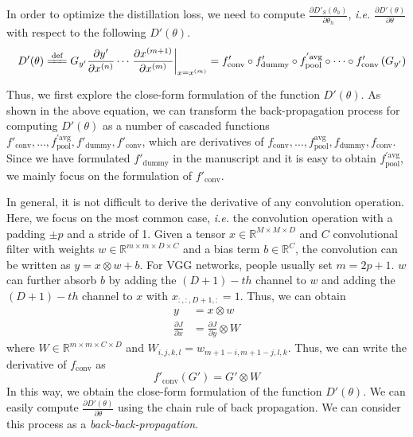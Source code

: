 \documentclass[10pt,twocolumn,letterpaper]{article}
\begin{document}
In order to optimize the distillation loss, we need to compute $\frac{\partial D'_{S}(\theta_{h})}{\partial\theta_{h}}$, \emph{i.e.} $\frac{\partial D'(\theta)}{\partial\theta}$ with respect to the following $D'(\theta)$.
\begin{equation}
\quad D'(\theta)\xlongequal[]{\textrm{def}}G_{y'}\frac{\partial y'}{\partial x^{(n)}}\cdots\left.\frac{\partial x^{(m+1)}}{\partial x^{(m)}}\right|_{x=x^{(m)}}
=f'_{\textrm{conv}}\circ f'_{\textrm{dummy}}\circ f_{\textrm{pool}}^{'\textrm{avg}}\circ\cdots\circ f'_{\textrm{conv}}\left(G_{y'}\right)\nonumber
\end{equation}

Thus, we first explore the close-form formulation of the function $D'(\theta)$. As shown in the above equation, we can transform the back-propagation process for computing $D'(\theta)$ as a number of cascaded functions $f'_{\textrm{conv}},\ldots,f_{\textrm{pool}}^{'\textrm{avg}},f'_{\textrm{dummy}},f'_{\textrm{conv}}$, which are derivatives of $f_{\textrm{conv}},\ldots,f_{\textrm{pool}}^{\textrm{avg}},f_{\textrm{dummy}},f_{\textrm{conv}}$. Since we have formulated $f'_{\textrm{dummy}}$ in the manuscript and it is easy to obtain $f_{\textrm{pool}}^{'\textrm{avg}}$, we mainly focus on the formulation of $f'_{\textrm{conv}}$.

In general, it is not difficult to derive the derivative of any convolution operation. Here, we focus on the most common case, \emph{i.e.} the convolution operation with a padding $\pm p$ and a stride of 1. Given a tensor $x\in{\mathbb R}^{M\times M\times D}$ and $C$ convolutional filter with weights $w\in{\mathbb R}^{m\times m\times D\times C}$ and a bias term $b\in{\mathbb R}^{C}$, the convolution can be written as $y=x\otimes w+b$. For VGG networks, people usually set $m=2p+1$. $w$ can further absorb $b$ by adding the $(D+1)-th$ channel to $w$ and adding the $(D+1)-th$ channel to $x$ with $x_{:,:,D+1,:}=1$. Thus, we can obtain
\begin{equation}
\begin{split}
y&=x\otimes w\\
\frac{\partial J}{\partial x}&=\frac{\partial J}{\partial y}\otimes W
\end{split}
\nonumber
\end{equation}
where $W\in{\mathbb R}^{m\times m\times C\times D}$ and $W_{i,j,k,l}=w_{m+1-i,m+1-j,l,k}$. Thus, we can write the derivative of $f_{\textrm{conv}}$ as
\begin{equation}
f'_{\textrm{conv}}(G')=G'\otimes W
\nonumber
\end{equation}
In this way, we obtain the close-form formulation of the function $D'(\theta)$. We can easily compute $\frac{\partial D'(\theta)}{\partial\theta}$ using the chain rule of back propagation. We can consider this process as a \textit{back-back-propagation}.
\end{document}
